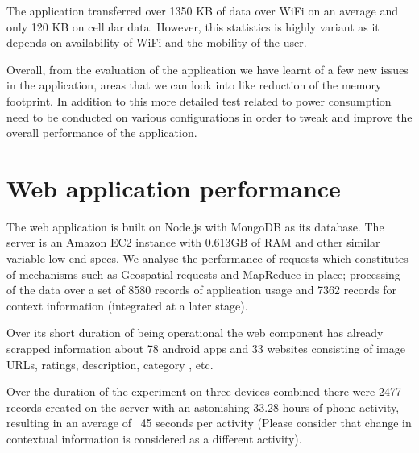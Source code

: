 \documentclass[12pt]{report}
\begin{document}
The application transferred over 1350 KB of data over WiFi on an average and only 120 KB on cellular data. However, this statistics is highly variant as it depends on availability of WiFi and the mobility of the user.

Overall, from the evaluation of the application we have learnt of a few new issues in the application, areas that we can look into like reduction of the memory footprint. In addition to this more detailed test related to power consumption need to be conducted on various configurations in order to tweak and improve the overall performance of the application.

\section{Web application performance}

The web application is built on Node.js with MongoDB as its database. The server is an Amazon EC2 instance with 0.613GB of RAM and other similar variable low end specs. We analyse the performance of requests which constitutes of mechanisms such as Geospatial requests and MapReduce in place; processing of the data over a set of 8580 records of application usage and 7362 records for context information (integrated at a later stage).

Over its short duration of being operational the web component has already scrapped information about 78 android apps and 33 websites consisting of image URLs, ratings, description, category , etc.

Over the duration of the experiment on three devices combined there were 2477 records created on the server with an astonishing 33.28 hours of phone activity, resulting in an average of ~45 seconds per activity (Please consider that change in contextual information is considered as a different activity).
\end{document}
